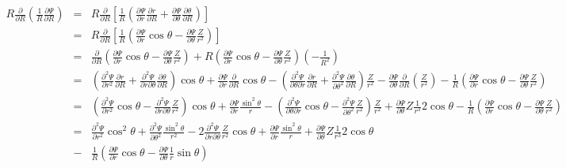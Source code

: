 \documentclass{article}
\begin{document}
\begin{eqnarray}
  R \frac{\partial}{\partial R} \left( \frac{1}{R} \frac{\partial
  \Psi}{\partial R} \right) & = & R \frac{\partial}{\partial R} \left[
  \frac{1}{R} \left( \frac{\partial \Psi}{\partial r}  \frac{\partial
  r}{\partial R} + \frac{\partial \Psi}{\partial \theta}  \frac{\partial
  \theta}{\partial R} \right) \right] \nonumber\\
  & = & R \frac{\partial}{\partial R} \left[ \frac{1}{R} \left(
  \frac{\partial \Psi}{\partial r} \cos \theta - \frac{\partial \Psi}{\partial
  \theta}  \frac{Z}{r^2} \right) \right] \nonumber\\
  & = & \frac{\partial}{\partial R} \left( \frac{\partial \Psi}{\partial r}
  \cos \theta - \frac{\partial \Psi}{\partial \theta}  \frac{Z}{r^2} \right) +
  R \left( \frac{\partial \Psi}{\partial r} \cos \theta - \frac{\partial
  \Psi}{\partial \theta}  \frac{Z}{r^2} \right) \left( - \frac{1}{R^2} \right)
  \nonumber\\
  & = & \left( \frac{\partial^2 \Psi}{\partial r^2} \frac{\partial
  r}{\partial R} + \frac{\partial^2 \Psi}{\partial r \partial \theta}
  \frac{\partial \theta}{\partial R} \right) \cos \theta + \frac{\partial
  \Psi}{\partial r} \frac{\partial}{\partial R} \cos \theta - \left(
  \frac{\partial^2 \Psi}{\partial \theta \partial r} \frac{\partial
  r}{\partial R} + \frac{\partial^2 \Psi}{\partial \theta^2} \frac{\partial
  \theta}{\partial R} \right) \frac{Z}{r^2} - \frac{\partial \Psi}{\partial
  \theta} \frac{\partial}{\partial R} \left( \frac{Z}{r^2} \right) -
  \frac{1}{R} \left( \frac{\partial \Psi}{\partial r} \cos \theta -
  \frac{\partial \Psi}{\partial \theta}  \frac{Z}{r^2} \right) \nonumber\\
  & = & \left( \frac{\partial^2 \Psi}{\partial r^2} \cos \theta -
  \frac{\partial^2 \Psi}{\partial r \partial \theta}  \frac{Z}{r^2} \right)
  \cos \theta + \frac{\partial \Psi}{\partial r}  \frac{\sin^2 \theta}{r} -
  \left( \frac{\partial^2 \Psi}{\partial \theta \partial r} \cos \theta -
  \frac{\partial^2 \Psi}{\partial \theta^2} \frac{Z}{r^2} \right)
  \frac{Z}{r^2} + \frac{\partial \Psi}{\partial \theta} Z \frac{1}{r^3} 2 \cos
  \theta - \frac{1}{R} \left( \frac{\partial \Psi}{\partial r} \cos \theta -
  \frac{\partial \Psi}{\partial \theta}  \frac{Z}{r^2} \right) \nonumber\\
  & = & \frac{\partial^2 \Psi}{\partial r^2} \cos^2 \theta + \frac{\partial^2
  \Psi}{\partial \theta^2}  \frac{\sin^2 \theta}{r^2} - 2 \frac{\partial^2
  \Psi}{\partial r \partial \theta}  \frac{Z}{r^2} \cos \theta +
  \frac{\partial \Psi}{\partial r}  \frac{\sin^2 \theta}{r} + \frac{\partial
  \Psi}{\partial \theta} Z \frac{1}{r^3} 2 \cos \theta  \label{9-17-e3}\\
  & - & \frac{1}{R} \left( \frac{\partial \Psi}{\partial r} \cos \theta -
  \frac{\partial \Psi}{\partial \theta}  \frac{1}{r} \sin \theta \right) 
\end{eqnarray}
\end{document}
